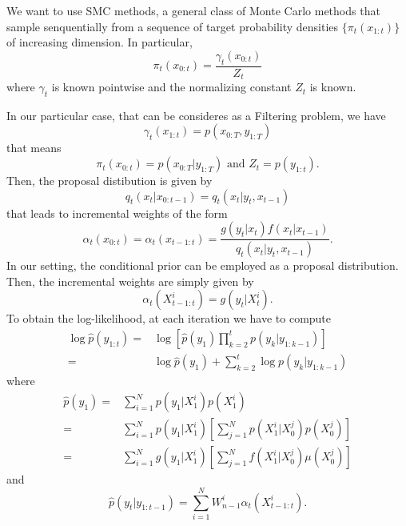 \documentclass[]{article}
\begin{document}
We want to use SMC methods, a general class of Monte Carlo methods that sample senquentially from a sequence of target probability densities $\{ \pi_t(x_{1:t}) \}$ of increasing dimension. In particular, 
$$
\pi_t(x_{0:t}) = \frac{\gamma_t(x_{0:t})}{Z_t}
$$
where 
$\gamma_t$ is known pointwise and the normalizing constant $Z_t$ is known.

In our particular case, that can be consideres as a Filtering problem, we have
$$
\gamma_t(x_{1:t}) = p(x_{0:T},y_{1:T})
$$ 
that means
$$
\pi_t(x_{0:t}) = p(x_{0:T}|y_{1:T}) \text{ and } Z_t = p(y_{1:t}).
$$
Then, the proposal distibution is given by 
$$
q_t(x_t|x_{0:t-1}) = q_t(x_t|y_t, x_{t-1})
$$
that leads to incremental weights of the form
$$
\alpha_t(x_{0:t}) = \alpha_t(x_{t-1:t}) = \frac{g(y_t|x_t)f(x_t|x_{t-1})}{q_t(x_t|y_t, x_{t-1})}.  
$$
In our setting, the conditional prior can be employed as a proposal distribution. Then, the incremental weights are simply given by
$$
\alpha_t(X_{t-1:t}^i) = g(y_t|X_t^i).
$$
To obtain the log-likelihood, at each iteration we have to compute
\begin{align*}
	\log\hat{p}(y_{1:t}) = & \log[ \hat{p}(y_1) \prod_{k=2}^{t} p(y_k|y_{1:k-1})] \\
	= & \log \hat{p}(y_1) + \sum_{k=2}^{t} \log p(y_k|y_{1:k-1})
\end{align*}
where
\begin{align*}
	\hat{p}(y_1) = & \sum_{i=1}^{N} p(y_1|X_1^i)p(X_1^i) \\
	= & \sum_{i=1}^{N} p(y_1|X_1^i)[\sum_{j=1}^{N}p(X_1^i|X_0^j)p(X_0^j)] \\
	= & \sum_{i=1}^{N} g(y_1|X_1^i)[\sum_{j=1}^{N}f(X_1^i|X_0^j)\mu(X_0^j)]
\end{align*}
and
$$
\hat{p}(y_t|y_{1:t-1}) = \sum_{i=1}^{N}W_{n-1}^i\alpha_t(X_{t-1:t}^i).
$$
\end{document}
